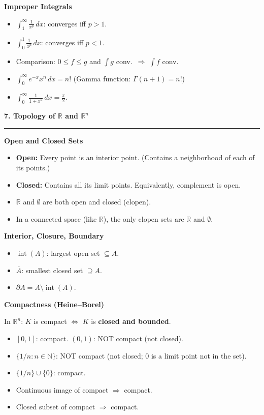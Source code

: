 \documentclass[10pt,twocolumn]{article}
\newcommand{\sect}[1]{\medskip\noindent\textbf{\large #1}\medskip\hrule\smallskip}
\newcommand{\subsect}[1]{\smallskip\noindent\textbf{#1}\par}
\begin{document}
\subsect{Improper Integrals}
\begin{itemize}[nosep,leftmargin=*]
\item $\int_1^\infty \frac{1}{x^p}\,dx$: converges iff $p>1$.
\item $\int_0^1 \frac{1}{x^p}\,dx$: converges iff $p<1$.
\item Comparison: $0\le f\le g$ and $\int g$ conv.\ $\Rightarrow$ $\int f$ conv.
\item $\int_0^\infty e^{-x}x^n\,dx = n!$ \;(Gamma function: $\Gamma(n+1)=n!$)
\item $\int_0^\infty \frac{1}{1+x^2}\,dx = \frac{\pi}{2}$.
\end{itemize}

\sect{7. Topology of $\mathbb{R}$ and $\mathbb{R}^n$}

\subsect{Open and Closed Sets}
\begin{itemize}[nosep,leftmargin=*]
\item \textbf{Open:} Every point is an interior point. (Contains a neighborhood of each of its points.)
\item \textbf{Closed:} Contains all its limit points. Equivalently, complement is open.
\item $\mathbb{R}$ and $\emptyset$ are both open and closed (clopen).
\item In a connected space (like $\mathbb{R}$), the only clopen sets are $\mathbb{R}$ and $\emptyset$.
\end{itemize}

\subsect{Interior, Closure, Boundary}
\begin{itemize}[nosep,leftmargin=*]
\item $\operatorname{int}(A)$: largest open set $\subseteq A$.
\item $\overline{A}$: smallest closed set $\supseteq A$.
\item $\partial A = \overline{A}\setminus\operatorname{int}(A)$.
\end{itemize}

\subsect{Compactness (Heine--Borel)}
In $\mathbb{R}^n$: $K$ is compact $\iff$ $K$ is \textbf{closed and bounded}.

\begin{itemize}[nosep,leftmargin=*]
\item $[0,1]$: compact. \quad $(0,1)$: NOT compact (not closed).
\item $\{1/n:n\in\mathbb{N}\}$: NOT compact (not closed; $0$ is a limit point not in the set).
\item $\{1/n\}\cup\{0\}$: compact.
\item Continuous image of compact $\Rightarrow$ compact.
\item Closed subset of compact $\Rightarrow$ compact.
\end{itemize}
\end{document}
